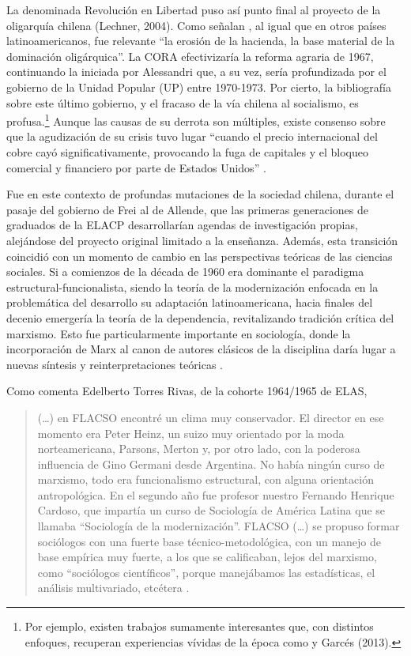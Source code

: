 La denominada Revolución en Libertad puso así punto final al proyecto de la oligarquía chilena (Lechner, 2004). Como señalan \textcite[613-614]{1518-ANSALDI2012}, al igual que en otros países latinoamericanos, fue relevante \enquote{la erosión de la hacienda, la base material de la dominación oligárquica}. La CORA efectivizaría la reforma agraria de 1967, continuando la iniciada por Alessandri que, a su vez, sería profundizada por el gobierno de la Unidad Popular (UP) entre 1970-1973. Por cierto, la bibliografía sobre este último gobierno, y el fracaso de la vía chilena al socialismo, es profusa.\footnote{Por ejemplo, existen trabajos sumamente interesantes que, con distintos enfoques, recuperan experiencias vívidas de la época como \textcite{1503-TOURAINE1974} y Garcés (2013).} Aunque las causas de su derrota son múltiples, existe consenso sobre que la agudización de su crisis tuvo lugar \enquote{cuando el precio internacional del cobre cayó significativamente, provocando la fuga de capitales y el bloqueo comercial y financiero por parte de Estados Unidos} \parencite[408]{1519-ANSALDI2012}.

Fue en este contexto de profundas mutaciones de la sociedad chilena, durante el pasaje del gobierno de Frei al de Allende, que las primeras generaciones de graduados de la ELACP desarrollarían agendas de investigación propias, alejándose del proyecto original limitado a la enseñanza. Además, esta transición coincidió con un momento de cambio en las perspectivas teóricas de las ciencias sociales. Si a comienzos de la década de 1960 era dominante el paradigma estructural-funcionalista, siendo la teoría de la modernización enfocada en la problemática del desarrollo su adaptación latinoamericana, hacia finales del decenio emergería la teoría de la dependencia, revitalizando tradición crítica del marxismo. Esto fue particularmente importante en sociología, donde la incorporación de Marx al canon de autores clásicos de la disciplina daría lugar a nuevas síntesis y reinterpretaciones teóricas \parencite{1516-ALEXANDER2008}.

Como comenta Edelberto Torres Rivas, de la cohorte 1964/1965 de ELAS,

\begin{quote}
(\dots) en FLACSO encontré un clima muy conservador. El director en ese momento era Peter Heinz, un suizo muy orientado por la moda norteamericana, Parsons, Merton y, por otro lado, con la poderosa influencia de Gino Germani desde Argentina. No había ningún curso de marxismo, todo era funcionalismo estructural, con alguna orientación antropológica. En el segundo año fue profesor nuestro Fernando Henrique Cardoso, que impartía un curso de Sociología de América Latina que se llamaba \enquote{Sociología de la modernización}. FLACSO (\dots) se propuso formar sociólogos con una fuerte base técnico-metodológica, con un manejo de base empírica muy fuerte, a los que se calificaban, lejos del marxismo, como \enquote{sociólogos científicos}, porque manejábamos las estadísticas, el análisis multivariado, etcétera \parencite[111]{1520-BATAILLON2006}.
\end{quote}

